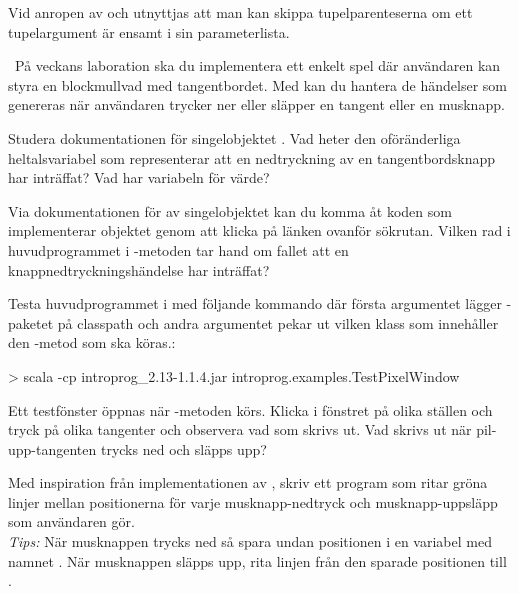 \SubtaskSolved Vid anropen av  och  utnyttjas att man kan skippa tupelparenteserna om ett tupelargument är ensamt i sin parameterlista.



\QUESTEND




\QUESTBEGIN

\Task \what~På veckans laboration ska du implementera ett enkelt spel där användaren kan styra en blockmullvad med tangentbordet. Med  kan du hantera de händelser som genereras när användaren trycker ner eller släpper en tangent eller en musknapp.


\Subtask Studera dokumentationen för singelobjektet . Vad heter den oföränderliga heltalsvariabel som representerar att en nedtryckning av en tangentbordsknapp har inträffat? Vad har variabeln för värde?

\Subtask Via dokumentationen för av singelobjektet  kan du komma åt koden som implementerar objektet genom att klicka på länken  ovanför sökrutan. Vilken rad i huvudprogrammet i -metoden tar hand om fallet att en knappnedtryckningshändelse har inträffat?

\Subtask Testa huvudprogrammet i  med följande kommando där första argumentet lägger -paketet på classpath och andra argumentet pekar ut vilken klass som innehåller den -metod som ska köras.:
\begin{REPLnonum}
> scala -cp introprog_2.13-1.1.4.jar introprog.examples.TestPixelWindow
\end{REPLnonum}
Ett testfönster öppnas när -metoden körs. Klicka i fönstret på olika ställen och tryck på olika tangenter och observera vad som skrivs ut. Vad skrivs ut när pil-upp-tangenten trycks ned och släpps upp?

\Subtask Med inspiration från implementationen av , skriv ett program som ritar gröna linjer mellan positionerna för varje musknapp-nedtryck och musknapp-uppsläpp som användaren gör. \\\emph{Tips:} När musknappen trycks ned så spara undan positionen i en variabel med namnet . När musknappen släpps upp, rita linjen från den sparade positionen till .

\SOLUTION

